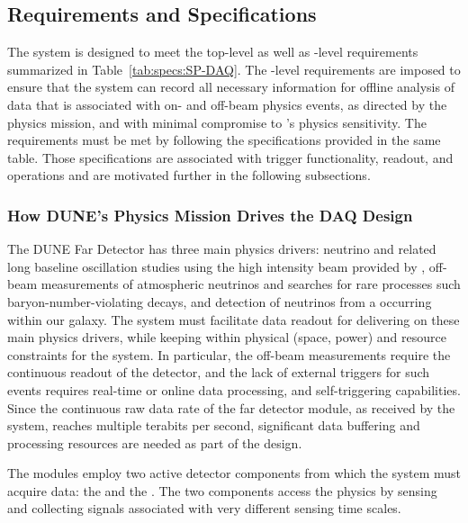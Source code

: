 \subsection{Requirements and Specifications}
\label{sec:fd-daq:requirements}

The    system is designed to meet the
 top-level as well as -level requirements
summarized in Table~\ref{tab:specs:SP-DAQ}. The -level requirements are
imposed to ensure that the 
system %
can record all necessary information for offline 
analysis of data that is associated with on- and off-beam physics events, as directed
by the  physics mission, and with minimal compromise to
's physics sensitivity. The requirements must be met by following the 
specifications provided in the same table.
Those specifications are
associated with trigger functionality, readout,
and operations and are motivated further in the following subsections.

\subsubsection{How DUNE's Physics Mission Drives the DAQ Design}

The DUNE Far Detector has three main physics drivers: neutrino  and related
long baseline oscillation studies using the high intensity beam provided
by \fnal, off-beam measurements of atmospheric neutrinos and searches
for rare processes such baryon-number-violating decays,
and detection of neutrinos from a  occurring within our galaxy. The
   system must facilitate data
readout for delivering on these main physics drivers, while keeping
within physical (space, power) and resource constraints for
the system. In particular, the off-beam measurements require the
continuous readout of the detector, and the lack of external triggers for such
events requires real-time or online data processing, and
self-triggering capabilities. Since the
continuous raw data rate of the far detector module, as received by
the  system, reaches multiple
terabits per second, significant data buffering and processing
resources are needed as part of the design.

The   modules employ two active detector components from which the  system must acquire data: the  and the . The two components access the physics by sensing and collecting signals associated with very different sensing time scales.

